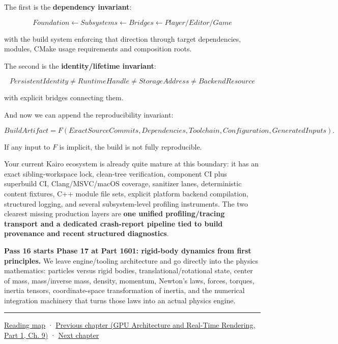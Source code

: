 The first is the \textbf{dependency invariant}:

\[
\boxed{
Foundation
\leftarrow
Subsystems
\leftarrow
Bridges
\leftarrow
Player/Editor/Game
}
\]

with the build system enforcing that direction through target dependencies, modules, CMake usage requirements and composition roots.

The second is the \textbf{identity/lifetime invariant}:

\[
\boxed{
PersistentIdentity
\neq
RuntimeHandle
\neq
StorageAddress
\neq
BackendResource
}
\]

with explicit bridges connecting them.

And now we can append the reproducibility invariant:

\[
\boxed{
BuildArtifact
=
F(
ExactSourceCommits,
Dependencies,
Toolchain,
Configuration,
GeneratedInputs
).
}
\]

If any input to \(F\) is implicit, the build is not fully reproducible.

Your current Kairo ecosystem is already quite mature at this boundary: it has an exact sibling-workspace lock, clean-tree verification, component CI plus superbuild CI, Clang/MSVC/macOS coverage, sanitizer lanes, deterministic content fixtures, C++ module file sets, explicit platform backend compilation, structured logging, and several subsystem-level profiling instruments. The two clearest missing production layers are \textbf{one unified profiling/tracing transport and a dedicated crash-report pipeline tied to build provenance and recent structured diagnostics}.

\textbf{Pass 16 starts Phase 17 at Part 1601: rigid-body dynamics from first principles.} We leave engine/tooling architecture and go directly into the physics mathematics: particles versus rigid bodies, translational/rotational state, center of mass, mass/inverse mass, density, momentum, Newton's laws, forces, torques, inertia tensors, coordinate-space transformation of inertia, and the numerical integration machinery that turns those laws into an actual physics engine.

\begin{center}\rule{0.5\linewidth}{0.5pt}\end{center}

\hyperref[volume-reading-map]{Reading map} · \href{../06-GPU-Architecture-and-Real-Time-Rendering-P01/main.pdf\#nameddest=03-visual-computing-i-ch016-gpu-memory-divergence-and-execution-order}{Previous chapter (GPU Architecture and Real-Time Rendering, Part 1, Ch. 9)} · \hyperref[03-visual-computing-i-ch018-c-representation-ownership-and-lifetime]{Next chapter}
